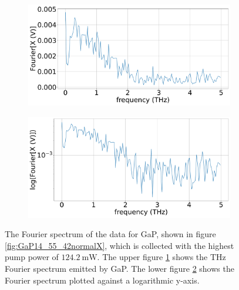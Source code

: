 \begin{figure}%
    \centering
    \begin{subfigure}{.6\textwidth}%
        \centering
        \includegraphics[width=\textwidth]{Plots/GaP14_55_42normalFX.pdf}%
        \caption{}
        \label{fig:GaP14_55_42_fft}%
        \end{subfigure}%
    \hfill%
        \begin{subfigure}{.6\textwidth}%
        \centering
        \includegraphics[width=\textwidth]{Plots/GaP14_55_42normallog(FX).pdf}%
        \caption{}
        \label{fig:GaP14_55_42_fft_log}%
    \end{subfigure}%
    \caption{The Fourier spectrum of the data for GaP, shown in figure \ref{fig:GaP14_55_42normalX}, which is collected with the highest pump power of $\SI{124.2}{\milli\W}$.
    The upper figure \ref{fig:GaP14_55_42_fft} shows the $\si{\tera\hertz}$ Fourier spectrum emitted by GaP.
    The lower figure \ref{fig:GaP14_55_42_fft_log} shows the Fourier spectrum plotted against a logarithmic y-axis.}%
    \label{fig:fourier_gap}%
\end{figure}%
\FloatBarrier
